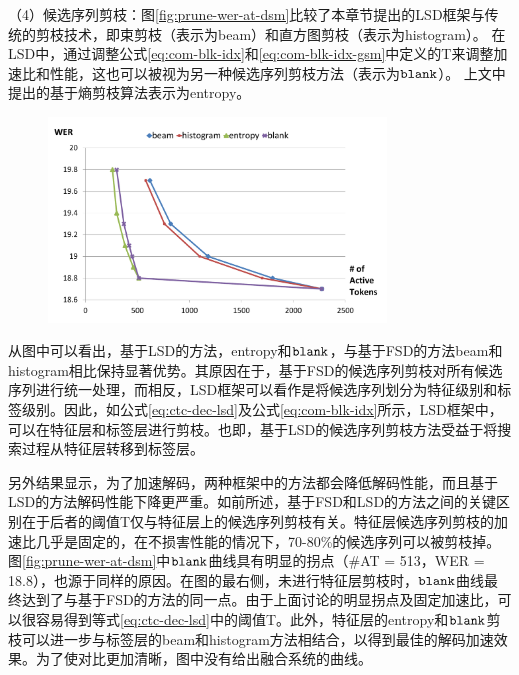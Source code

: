 （4）候选序列剪枝：图\ref{fig:prune-wer-at-dsm}比较了本章节提出的LSD框架与传统的剪枝技术，即束剪枝（表示为beam）和直方图剪枝（表示为histogram）。 在LSD中，通过调整公式\ref{eq:com-blk-idx}和\ref{eq:com-blk-idx-gsm}中定义的T来调整加速比和性能，这也可以被视为另一种候选序列剪枝方法（表示为$\tt blank$）。 上文中提出的基于熵剪枝算法表示为entropy。
 

\begin{figure}[htb]
  \centering
    \captionstyle{\centering}
    \includegraphics[width=0.8\textwidth]{figure/prune-wer-at-dsm.pdf}
\end{figure}


从图中可以看出，基于LSD的方法，entropy和$\tt blank$，与基于FSD的方法beam和histogram相比保持显著优势。其原因在于，基于FSD的候选序列剪枝对所有候选序列进行统一处理，而相反，LSD框架可以看作是将候选序列划分为特征级别和标签级别。因此，如公式\ref{eq:ctc-dec-lsd}及公式\ref{eq:com-blk-idx}所示，LSD框架中，可以在特征层和标签层进行剪枝。也即，基于LSD的候选序列剪枝方法受益于将搜索过程从特征层转移到标签层。

另外结果显示，为了加速解码，两种框架中的方法都会降低解码性能，而且基于LSD的方法解码性能下降更严重。如前所述，基于FSD和LSD的方法之间的关键区别在于后者的阈值T仅与特征层上的候选序列剪枝有关。特征层候选序列剪枝的加速比几乎是固定的，在不损害性能的情况下，70-80\%的候选序列可以被剪枝掉。图\ref{fig:prune-wer-at-dsm}中$\tt blank$曲线具有明显的拐点（\#AT = 513，WER = 18.8），也源于同样的原因。在图的最右侧，未进行特征层剪枝时，$\tt blank$曲线最终达到了与基于FSD的方法的同一点。由于上面讨论的明显拐点及固定加速比，可以很容易得到等式\ref{eq:ctc-dec-lsd}中的阈值T。此外，特征层的entropy和$\tt blank$剪枝可以进一步与标签层的beam和histogram方法相结合，以得到最佳的解码加速效果。为了使对比更加清晰，图中没有给出融合系统的曲线。

